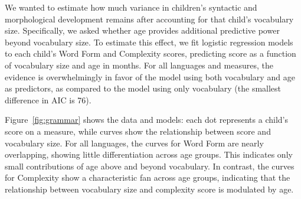 \documentclass[10pt,letterpaper]{article}
\begin{document}
\begin{figure}
\centering
{}
\end{figure}

We wanted to estimate how much variance in children's syntactic and morphological development remains after accounting for that child's vocabulary size. Specifically, we asked whether age provides additional predictive power beyond vocabulary size. To estimate this effect, we fit logistic regression models to each child's Word Form and Complexity scores, predicting score as a function of vocabulary size and age in months. For all languages and measures, the evidence is overwhelmingly in favor of the model using both vocabulary and age as predictors, as compared to the model using only vocabulary (the smallest difference in AIC is 76). %

Figure~\ref{fig:grammar} shows the data and models: each dot represents a child's score on a measure, while curves show the relationship between score and vocabulary size.
For all languages, the curves for Word Form are nearly overlapping, showing little differentiation across age groups. This indicates only small contributions of age above and beyond vocabulary. In contrast, the curves for Complexity show a characteristic fan across age groups, indicating that the relationship between vocabulary size and complexity score is modulated by age. %
\end{document}
